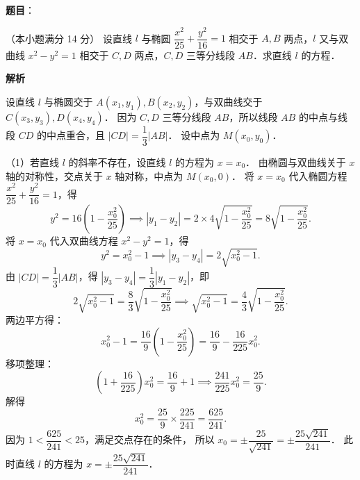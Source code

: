 \begin{answer}

\end{answer}
\begin{answer}

\textbf{题目}：

（本小题满分 14 分）
设直线 $l$ 与椭圆 $\dfrac{x^2}{25} + \dfrac{y^2}{16} = 1$ 相交于 $A, B$ 两点，$l$ 又与双曲线 $x^2 - y^2 = 1$ 相交于 $C, D$ 两点，$C, D$ 三等分线段 $AB$．求直线 $l$ 的方程．

\textbf{解析}

设直线 $l$ 与椭圆交于 $A(x_1, y_1), B(x_2, y_2)$，与双曲线交于 $C(x_3, y_3), D(x_4, y_4)$．
因为 $C, D$ 三等分线段 $AB$，所以线段 $AB$ 的中点与线段 $CD$ 的中点重合，且 $|CD| = \dfrac{1}{3}|AB|$．
设中点为 $M(x_0, y_0)$．

（1）若直线 $l$ 的斜率不存在，设直线 $l$ 的方程为 $x = x_0$．
由椭圆与双曲线关于 $x$ 轴的对称性，交点关于 $x$ 轴对称，中点为 $M(x_0, 0)$．
将 $x = x_0$ 代入椭圆方程 $\dfrac{x^2}{25} + \dfrac{y^2}{16} = 1$，得
\nopagebreak[4]
\[
y^2 = 16\left(1 - \dfrac{x_0^2}{25}\right) \implies |y_1 - y_2| = 2 \times 4\sqrt{1 - \dfrac{x_0^2}{25}} = 8\sqrt{1 - \dfrac{x_0^2}{25}}.
\]
将 $x = x_0$ 代入双曲线方程 $x^2 - y^2 = 1$，得
\nopagebreak[4]
\[
y^2 = x_0^2 - 1 \implies |y_3 - y_4| = 2\sqrt{x_0^2 - 1}.
\]
由 $|CD| = \dfrac{1}{3}|AB|$，得 $|y_3 - y_4| = \dfrac{1}{3}|y_1 - y_2|$，即
\nopagebreak[4]
\[
2\sqrt{x_0^2 - 1} = \dfrac{8}{3}\sqrt{1 - \dfrac{x_0^2}{25}} \implies \sqrt{x_0^2 - 1} = \dfrac{4}{3}\sqrt{1 - \dfrac{x_0^2}{25}}.
\]
两边平方得：
\nopagebreak[4]
\[
x_0^2 - 1 = \dfrac{16}{9}\left(1 - \dfrac{x_0^2}{25}\right) = \dfrac{16}{9} - \dfrac{16}{225}x_0^2.
\]
移项整理：
\nopagebreak[4]
\[
\left(1 + \dfrac{16}{225}\right)x_0^2 = \dfrac{16}{9} + 1 \implies \dfrac{241}{225}x_0^2 = \dfrac{25}{9}.
\]
解得
\nopagebreak[4]
\[
x_0^2 = \dfrac{25}{9} \times \dfrac{225}{241} = \dfrac{625}{241}.
\]
因为 $1 < \dfrac{625}{241} < 25$，满足交点存在的条件，
所以 $x_0 = \pm \dfrac{25}{\sqrt{241}} = \pm \dfrac{25\sqrt{241}}{241}$．
此时直线 $l$ 的方程为 $x = \pm \dfrac{25\sqrt{241}}{241}$．


\end{answer}

